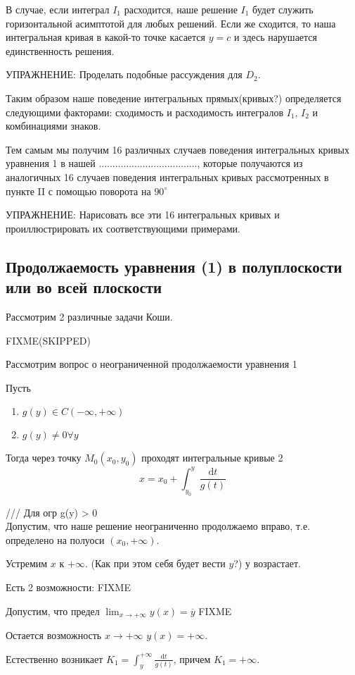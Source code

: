 \documentclass[a4paper,10pt]{report}
\newcommand{\ud}{\mathrm{d}}
\theoremstyle{definition}
\theoremstyle{remark}
\theoremstyle{plain}
\begin{document}
В случае, если интеграл $I_1$ расходится, наше решение $I_1$ будет служить горизонтальной асимптотой для любых решений. Если же сходится, то наша интегральная кривая в какой-то точке касается $y = c$ и здесь нарушается единственность решения.

УПРАЖНЕНИЕ: Проделать подобные рассуждения для $D_2$.

Таким образом наше поведение интегральных прямых(кривых?) определяется следующими факторами:
сходимость и расходимость интегралов $I_1$, $I_2$ и \\
комбинациями знаков.

Тем самым мы получим 16 различных случаев поведения интегральных кривых уравнения 1 в нашей ...................................., которые получаются из аналогичных 16 случаев поведения интегральных кривых рассмотренных в пункте II с помощью поворота на $90^\circ$

УПРАЖНЕНИЕ: Нарисовать все эти 16 интегральных кривых и проиллюстрировать их соответствующими примерами.

\subsection{Продолжаемость уравнения (1) в полуплоскости или во всей плоскости}
Рассмотрим 2 различные задачи Коши.

FIXME(SKIPPED)

Рассмотрим вопрос о неограниченной продолжаемости уравнения 1

Пусть
\begin{enumerate}
 \item $g(y) \in C(-\infty,+\infty)$
 \item $g(y) \ne 0 \forall y$
\end{enumerate}
Тогда через точку $M_0(x_0,y_0)$ проходят интегральные кривые 2
\[
 x = x_0 + \int_{y_0}^y \frac{\ud t}{g(t)}
\]

/// Для огр g(y) > 0\\
Допустим, что наше решение неограниченно продолжаемо вправо, т.е. определено на полуоси $(x_0,+\infty)$.

Устремим $x$ к $+\infty$. (Как при этом себя будет вести $y$?) $у$ возрастает.

Есть 2 возможности:
FIXME

Допустим, что предел $\lim_{x \to +\infty} y(x) = \overline{y}$ FIXME

Остается возможность $x \to +\infty$ $y (x) = +\infty$.

Естественно возникает $K_1 = \int_y^{+\infty} \frac{\ud t}{g(t)}$, причем $K_1 = +\infty$.
\end{document}
